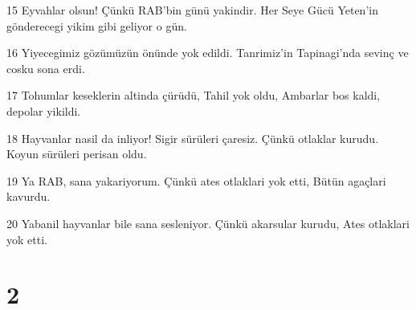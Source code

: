 \par 15 Eyvahlar olsun! Çünkü RAB'bin günü yakindir. Her Seye Gücü Yeten'in gönderecegi yikim gibi geliyor o gün.
\par 16 Yiyecegimiz gözümüzün önünde yok edildi. Tanrimiz'in Tapinagi'nda sevinç ve cosku sona erdi.
\par 17 Tohumlar keseklerin altinda çürüdü, Tahil yok oldu, Ambarlar bos kaldi, depolar yikildi.
\par 18 Hayvanlar nasil da inliyor! Sigir sürüleri çaresiz. Çünkü otlaklar kurudu. Koyun sürüleri perisan oldu.
\par 19 Ya RAB, sana yakariyorum. Çünkü ates otlaklari yok etti, Bütün agaçlari kavurdu.
\par 20 Yabanil hayvanlar bile sana sesleniyor. Çünkü akarsular kurudu, Ates otlaklari yok etti.

\chapter{2}

